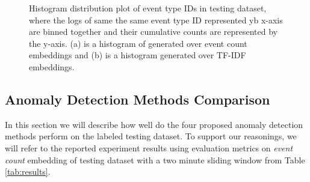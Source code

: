 \begin{figure}[h]%
    \centering
    \qquad
    \caption{Histogram distribution plot of event type IDs in testing dataset, where the logs of same the same event type ID represented yb x-axis are binned together and their cumulative counts are represented by the y-axis. (a) is a histogram of generated over event count embeddings and (b) is a histogram generated over TF-IDF embeddings.}%
    \label{fig:histogram-event-types}%
\end{figure}


\subsection{Anomaly Detection Methods Comparison}
In this section we will describe how well do the four proposed anomaly detection methods perform on the labeled testing dataset. To support our reasonings, we will refer to the reported experiment results using evaluation metrics on \textit{event count} embedding of testing dataset with a two minute sliding window from Table \ref{tab:results}. 

